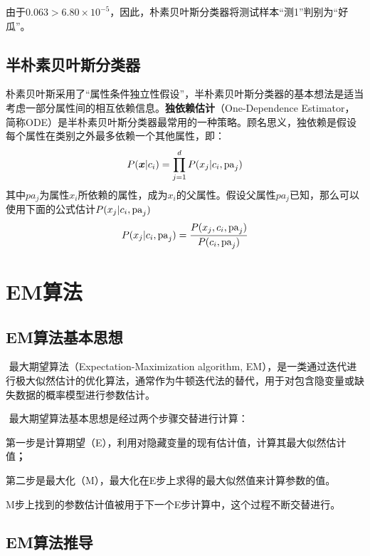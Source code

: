 由于$0.063>6.80\times 10^{-5}$，因此，朴素贝叶斯分类器将测试样本``测1''判别为``好瓜''。

\subsection{半朴素贝叶斯分类器}\label{ux534aux6734ux7d20ux8d1dux53f6ux65afux5206ux7c7bux5668}

​
朴素贝叶斯采用了``属性条件独立性假设''，半朴素贝叶斯分类器的基本想法是适当考虑一部分属性间的相互依赖信息。\textbf{独依赖估计}（One-Dependence
Estimator，简称ODE）是半朴素贝叶斯分类器最常用的一种策略。顾名思义，独依赖是假设每个属性在类别之外最多依赖一个其他属性，即：
\[
P(\boldsymbol{x}|c_i)=\prod_{j=1}^d P(x_j|c_i,{\rm pa}_j)
\]
其中$pa_j$为属性$x_i$所依赖的属性，成为$x_i$的父属性。假设父属性$pa_j$已知，那么可以使用下面的公式估计$P(x_j|c_i,{\rm pa}_j)$
\[
P(x_j|c_i,{\rm pa}_j)=\frac{P(x_j,c_i,{\rm pa}_j)}{P(c_i,{\rm pa}_j)}
\]

\section{ EM算法}\label{emux7b97ux6cd5}

\subsection{EM算法基本思想}\label{emux7b97ux6cd5ux57faux672cux601dux60f3}

​ 最大期望算法（Expectation-Maximization algorithm,
EM），是一类通过迭代进行极大似然估计的优化算法，通常作为牛顿迭代法的替代，用于对包含隐变量或缺失数据的概率模型进行参数估计。

​ 最大期望算法基本思想是经过两个步骤交替进行计算：

​
第一步是计算期望（E），利用对隐藏变量的现有估计值，计算其最大似然估计值\textbf{；}

​ 第二步是最大化（M），最大化在E步上求得的最大似然值来计算参数的值。

​ M步上找到的参数估计值被用于下一个E步计算中，这个过程不断交替进行。

\subsection{EM算法推导}\label{emux7b97ux6cd5ux63a8ux5bfc}

